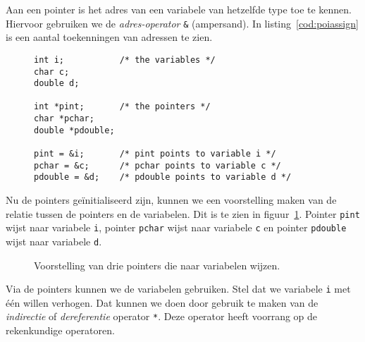 Aan een pointer is het adres van een variabele van hetzelfde type toe te kennen. Hiervoor gebruiken we de \textsl{adres-operator} \texttt{\&} (ampersand). In listing~\ref{cod:poiassign} is een aantal toekenningen van adressen te zien.

\begin{figure}[H]
\begin{lstlisting}[caption=Enkele toekenningen van adressen aan pointers.,label=cod:poiassign]
int i;           /* the variables */
char c;
double d;

int *pint;       /* the pointers */
char *pchar;
double *pdouble;

pint = &i;       /* pint points to variable i */
pchar = &c;      /* pchar points to variable c */
pdouble = &d;    /* pdouble points to variable d */
\end{lstlisting}
\end{figure}

Nu de pointers geïnitialiseerd zijn, kunnen we een voorstelling maken van de relatie tussen de pointers en de variabelen. Dit is te zien in figuur~\ref{fig:poivoorstelling2}. Pointer \texttt{pint} wijst naar variabele \texttt{i}, pointer \texttt{pchar} wijst naar variabele \texttt{c} en pointer \texttt{pdouble} wijst naar variabele \texttt{d}.

\begin{figure}[!ht]
\centering
{}
\caption{Voorstelling van drie pointers die naar variabelen wijzen.}
\label{fig:poivoorstelling2}
\end{figure}

Via de pointers kunnen we de variabelen gebruiken. Stel dat we variabele \texttt{i} met één willen verhogen. Dat kunnen we doen door gebruik te maken van de \textsl{indirectie} of \textsl{dereferentie} operator \texttt{*}. Deze operator heeft voorrang op de rekenkundige operatoren.

